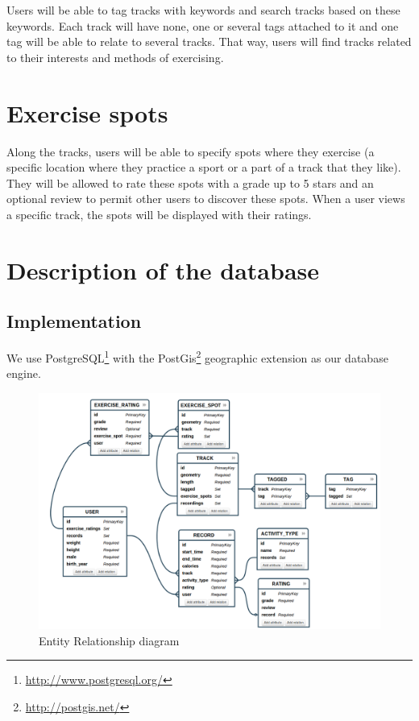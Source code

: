 \documentclass[a4paper]{article}
\begin{document}
Users will be able to tag tracks with keywords and search tracks based on these keywords. Each track will have none, one or several tags attached to it and one tag will be able to relate to several tracks. That way, users will find tracks related to their interests and methods of exercising.

\section{Exercise spots}

Along the tracks, users will be able to specify spots where they exercise (a specific location where they practice a sport or a part of a track that they like). They will be allowed to rate these spots with a grade up to 5 stars and an optional review to permit other users to discover these spots.
When a user views a specific track, the spots will be displayed with their ratings.

\section{Description of the database}

\subsection{Implementation}
We use PostgreSQL\footnote{\url{http://www.postgresql.org/}} with the PostGis\footnote{\url{http://postgis.net/}} geographic extension as our database engine.

\begin{figure}[h]
    \includegraphics[width=\textwidth]{er-diagram.png}
    \caption{Entity Relationship diagram}
\end{figure}
\end{document}
